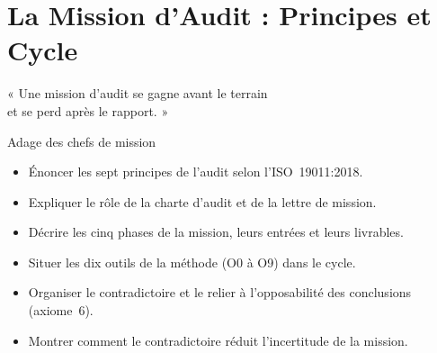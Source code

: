 
\chapter{La Mission d'Audit : Principes et Cycle}
\label{chap:mission}

\epigraph{%
    « Une mission d'audit se gagne avant le terrain\\
    et se perd après le rapport. »%
}{Adage des chefs de mission}


\begin{boxobjectifs}
\begin{itemize}
    \item Énoncer les sept principes de l'audit selon l'ISO~19011:2018.
    \item Expliquer le rôle de la charte d'audit et de la lettre de mission.
    \item Décrire les cinq phases de la mission, leurs entrées et leurs
          livrables.
    \item Situer les dix outils de la méthode (O0 à O9) dans le cycle.
    \item Organiser le contradictoire et le relier à l'opposabilité des
          conclusions (axiome~6).
    \item Montrer comment le contradictoire réduit l'incertitude de la
          mission.
\end{itemize}
\end{boxobjectifs}

\bigskip

